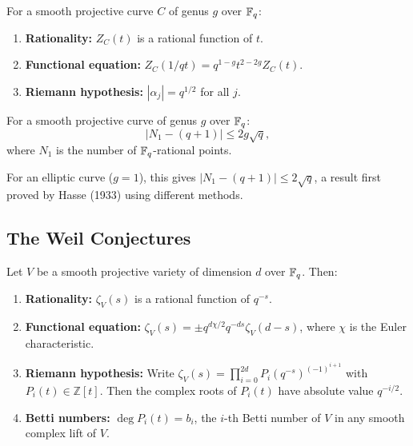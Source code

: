 \begin{theorem}[Weil, 1940]
For a smooth projective curve $C$ of genus $g$ over $\mathbb{F}_q$:
\begin{enumerate}
    \item \textbf{Rationality:} $Z_C(t)$ is a rational function of $t$.
    \item \textbf{Functional equation:} $Z_C(1/qt) = q^{1-g} t^{2-2g} Z_C(t)$.
    \item \textbf{Riemann hypothesis:} $|\alpha_j| = q^{1/2}$ for all $j$.
\end{enumerate}
\end{theorem}

\begin{corollary}
For a smooth projective curve of genus $g$ over $\mathbb{F}_q$:
\[
|N_1 - (q+1)| \leq 2g \sqrt{q},
\]
where $N_1$ is the number of $\mathbb{F}_q$-rational points.
\end{corollary}

For an elliptic curve ($g=1$), this gives $|N_1 - (q+1)| \leq 2\sqrt{q}$, a result first proved by Hasse (1933) using different methods.

\subsection{The Weil Conjectures}

\begin{theorem}
Let $V$ be a smooth projective variety of dimension $d$ over $\mathbb{F}_q$. Then:
\begin{enumerate}
    \item \textbf{Rationality:} $\zeta_V(s)$ is a rational function of $q^{-s}$.
    \item \textbf{Functional equation:} $\zeta_V(s) = \pm q^{d\chi/2} q^{-d s} \zeta_V(d-s)$, where $\chi$ is the Euler characteristic.
    \item \textbf{Riemann hypothesis:} Write $\zeta_V(s) = \prod_{i=0}^{2d} P_i(q^{-s})^{(-1)^{i+1}}$ with $P_i(t) \in \mathbb{Z}[t]$. Then the complex roots of $P_i(t)$ have absolute value $q^{-i/2}$.
    \item \textbf{Betti numbers:} $\deg P_i(t) = b_i$, the $i$-th Betti number of $V$ in any smooth complex lift of $V$.
\end{enumerate}
\end{theorem}

